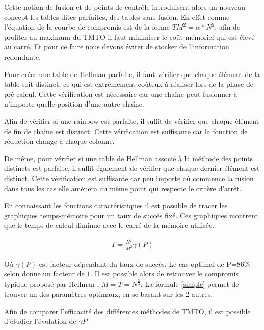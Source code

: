 	Cette notion de fusion et de points de contrôle introduisent alors un nouveau concept les tables dites parfaites, des tables sans fusion. En effet comme l'équation de la courbe de compromis est de la forme $TM^2=\alpha *N^2$, afin de profiter au maximum du \gls{TMTO} il faut minimiser le coût mémoriel qui est élevé au carré. Et pour ce faire nous devons éviter de stocker de l'information redondante.

	\bigskip

	Pour créer une table de Hellman parfaite, il faut vérifier que chaque élément de la table soit distinct, ce qui est extrêmement coûteux à réaliser lors de la phase de pré-calcul. Cette vérification est nécessaire car une chaîne peut fusionner à n'importe quelle position d'une autre chaîne.

	\bigskip

	Afin de vérifier si une \gls{rainbow} est parfaite, il suffit de vérifier que chaque élément de fin de chaîne est distinct. Cette vérification est suffisante car la fonction de réduction change à chaque colonne.

	\bigskip

	De même, pour vérifier si une table de Hellman associé à la méthode des points distincts est parfaite, il suffit également de vérifier que chaque dernier élément est distinct. Cette vérification est suffisante car peu importe où commence la fusion dans tous les cas elle amènera au même point qui respecte le critère d'arrêt.


	En connaissant les fonctions caractéristiques il est possible de tracer les graphiques temps-mémoire pour un taux de succès fixé. Ces graphiques montrent que le temps de calcul diminue avec le carré de la mémoire utilisée.

	\begin{align}
		T=\frac{N^2}{M^2}\gamma(P) \label{simple} 
	\end{align}

	Où $\gamma(P)$ est facteur dépendant du taux de succès. Le cas optimal de P=86\% selon \cite{checkpoints} donne un facteur de $1$. Il est possible alors de retrouver le compromis typique proposé par Hellman \cite{ehellman}, $M=T=N^{\frac{2}{3}}$. La formule \ref{simple} permet de trouver un des paramètres optimaux, en se basant sur les 2 autres.

	\bigskip

	Afin de comparer l'efficacité des différentes méthodes de \gls{TMTO}, il est possible d'étudier l'évolution de $\gamma{P}$.

